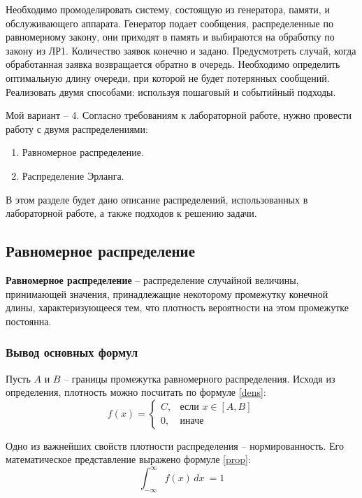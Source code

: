 Необходимо промоделировать систему, состоящую из генератора, памяти, и обслуживающего аппарата. Генератор подает сообщения, распределенные по равномерному закону, они приходят в память и выбираются на обработку по закону из ЛР1. Количество заявок конечно и задано. Предусмотреть случай, когда обработанная заявка возвращается обратно в очередь. Необходимо определить оптимальную длину очереди, при которой не будет потерянных сообщений. Реализовать двумя способами: используя пошаговый и событийный подходы.

Мой вариант -- 4.
Согласно требованиям к лабораторной работе, нужно провести работу с двумя распределениями:
\begin{enumerate}
	\item Равномерное распределение.
	\item Распределение Эрланга.
\end{enumerate}

В этом разделе будет дано описание распределений, использованных в лабораторной работе, а также подходов к решению задачи.

\subsection*{Равномерное распределение}
\textbf{Равномерное распределение} -- распределение случайной величины, принимающей значения, принадлежащие некоторому промежутку конечной длины, характеризующееся тем, что плотность вероятности на этом промежутке постоянна.


\subsubsection*{Вывод основных формул}
Пусть $A$ и $B$ -- границы промежутка равномерного распределения. Исходя из определения, плотность можно посчитать по формуле \ref{dens}:
\begin{equation}
	\label{dens}
	f(x)= 
	\begin{cases}
		C,& \text{если } x \in [A, B]\\
		0,              & \text{иначе}
	\end{cases}
\end{equation}

Одно из важнейших свойств плотности распределения -- нормированность. Его математическое представление выражено формуле \ref{prop}:
\begin{equation}
	\label{prop}
	\int_{-\infty}^{\infty} f(x) \,dx \ = 1
\end{equation}

